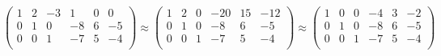 \documentclass[a4paper]{article}
\begin{document}
\begin{equation*}
 \left(\begin{array}{rrr|rrr}
1 & 2 & -3 & 1 & 0 & 0\\
0 & 1 & 0 & -8 & 6 & -5\\
0 & 0 & 1& -7 & 5 & -4\\
   \end{array}\right)
   \approx
 \left(\begin{array}{rrr|rrr}
1 & 2 & 0 & -20 & 15 & -12\\
0 & 1 & 0 & -8 & 6 & -5\\
0 & 0 & 1& -7 & 5 & -4\\
   \end{array}\right)
\approx
 \left(\begin{array}{rrr|rrr}
1 & 0 & 0 & -4 & 3 & -2\\
0 & 1 & 0 & -8 & 6 & -5\\
0 & 0 & 1& -7 & 5 & -4\\
   \end{array}\right)
\end{equation*}
\end{document}
